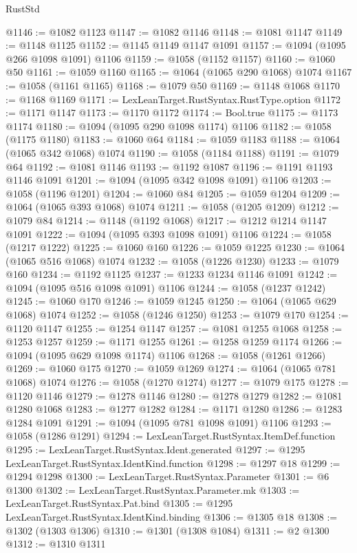\begin{lexlean}{RustStd}
\begin{coremodule}
@1146 := @1082 @1123
@1147 := @1082 @1146
@1148 := @1081 @1147
@1149 := @1148 @1125
@1152 := @1145 @1149 @1147 @1091
@1157 := @1094 (@1095 @266 @1098 @1091) @1106
@1159 := @1058 (@1152 @1157)
@1160 := @1060 @50
@1161 := @1059 @1160
@1165 := @1064 (@1065 @290 @1068) @1074
@1167 := @1058 (@1161 @1165)
@1168 := @1079 @50
@1169 := @1148 @1068
@1170 := @1168 @1169
@1171 := LexLeanTarget.RustSyntax.RustType.option
@1172 := @1171 @1147
@1173 := @1170 @1172
@1174 := Bool.true
@1175 := @1173 @1174
@1180 := @1094 (@1095 @290 @1098 @1174) @1106
@1182 := @1058 (@1175 @1180)
@1183 := @1060 @64
@1184 := @1059 @1183
@1188 := @1064 (@1065 @342 @1068) @1074
@1190 := @1058 (@1184 @1188)
@1191 := @1079 @64
@1192 := @1081 @1146
@1193 := @1192 @1087
@1196 := @1191 @1193 @1146 @1091
@1201 := @1094 (@1095 @342 @1098 @1091) @1106
@1203 := @1058 (@1196 @1201)
@1204 := @1060 @84
@1205 := @1059 @1204
@1209 := @1064 (@1065 @393 @1068) @1074
@1211 := @1058 (@1205 @1209)
@1212 := @1079 @84
@1214 := @1148 (@1192 @1068)
@1217 := @1212 @1214 @1147 @1091
@1222 := @1094 (@1095 @393 @1098 @1091) @1106
@1224 := @1058 (@1217 @1222)
@1225 := @1060 @160
@1226 := @1059 @1225
@1230 := @1064 (@1065 @516 @1068) @1074
@1232 := @1058 (@1226 @1230)
@1233 := @1079 @160
@1234 := @1192 @1125
@1237 := @1233 @1234 @1146 @1091
@1242 := @1094 (@1095 @516 @1098 @1091) @1106
@1244 := @1058 (@1237 @1242)
@1245 := @1060 @170
@1246 := @1059 @1245
@1250 := @1064 (@1065 @629 @1068) @1074
@1252 := @1058 (@1246 @1250)
@1253 := @1079 @170
@1254 := @1120 @1147
@1255 := @1254 @1147
@1257 := @1081 @1255 @1068
@1258 := @1253 @1257
@1259 := @1171 @1255
@1261 := @1258 @1259 @1174
@1266 := @1094 (@1095 @629 @1098 @1174) @1106
@1268 := @1058 (@1261 @1266)
@1269 := @1060 @175
@1270 := @1059 @1269
@1274 := @1064 (@1065 @781 @1068) @1074
@1276 := @1058 (@1270 @1274)
@1277 := @1079 @175
@1278 := @1120 @1146
@1279 := @1278 @1146
@1280 := @1278 @1279
@1282 := @1081 @1280 @1068
@1283 := @1277 @1282
@1284 := @1171 @1280
@1286 := @1283 @1284 @1091
@1291 := @1094 (@1095 @781 @1098 @1091) @1106
@1293 := @1058 (@1286 @1291)
@1294 := LexLeanTarget.RustSyntax.ItemDef.function
@1295 := LexLeanTarget.RustSyntax.Ident.generated
@1297 := @1295 LexLeanTarget.RustSyntax.IdentKind.function
@1298 := @1297 @18
@1299 := @1294 @1298
@1300 := LexLeanTarget.RustSyntax.Parameter
@1301 := @6 @1300
@1302 := LexLeanTarget.RustSyntax.Parameter.mk
@1303 := LexLeanTarget.RustSyntax.Pat.bind
@1305 := @1295 LexLeanTarget.RustSyntax.IdentKind.binding
@1306 := @1305 @18
@1308 := @1302 (@1303 @1306)
@1310 := @1301 (@1308 @1084)
@1311 := @2 @1300
@1312 := @1310 @1311

\end{coremodule}
\end{lexlean}
